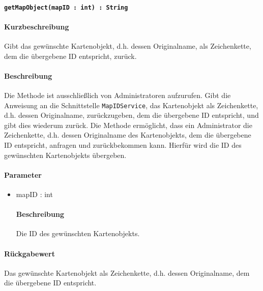 \paragraph{\texttt{getMapObject(mapID : int) : String}}%
\paragraph*{Kurzbeschreibung}
Gibt das gewünschte Kartenobjekt, d.h. dessen Originalname, als Zeichenkette, dem die übergebene ID entspricht, zurück.
\paragraph*{Beschreibung}
Die Methode ist ausschließlich von Administratoren aufzurufen.
Gibt die Anweisung an die Schnittstelle \texttt{MapIDService}, das Kartenobjekt als Zeichenkette, d.h. dessen Originalname, zurückzugeben, dem die übergebene ID entspricht, und gibt dies wiederum zurück.
Die Methode ermöglicht, dass ein Administrator die Zeichenkette, d.h. dessen Originalname des Kartenobjekts, dem die übergebene ID entspricht, anfragen und zurückbekommen kann.
Hierfür wird die ID des gewünschten Kartenobjekts übergeben.
\paragraph*{Parameter}
\begin{itemize}
	\item mapID : int
		\paragraph*{Beschreibung}
		Die ID des gewünschten Kartenobjekts.
\end{itemize}
\paragraph*{Rückgabewert}
Das gewünschte Kartenobjekt als Zeichenkette, d.h. dessen Originalname, dem die übergebene ID entspricht.
